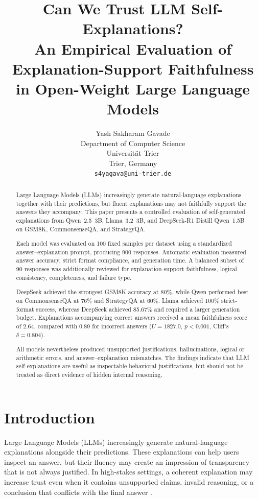 \documentclass{article}
\title{
Can We Trust LLM Self-Explanations?\\
An Empirical Evaluation of Explanation-Support Faithfulness
in Open-Weight Large Language Models
}
\author{
Yash Sakharam Gavade\\
Department of Computer Science\\
Universit\"at Trier\\
Trier, Germany\\
\texttt{s4yagava@uni-trier.de}
}
\begin{document}
\maketitle

\begin{abstract}

Large Language Models (LLMs) increasingly generate natural-language
explanations together with their predictions, but fluent explanations
may not faithfully support the answers they accompany. This paper
presents a controlled evaluation of self-generated explanations from
Qwen~2.5~3B, Llama~3.2~3B, and DeepSeek-R1 Distill Qwen~1.5B on
GSM8K, CommonsenseQA, and StrategyQA.

Each model was evaluated on 100 fixed samples per dataset using a
standardized answer--explanation prompt, producing 900 responses.
Automatic evaluation measured answer accuracy, strict format
compliance, and generation time. A balanced subset of 90 responses was
additionally reviewed for explanation-support faithfulness, logical
consistency, completeness, and failure type.

DeepSeek achieved the strongest GSM8K accuracy at 80\%, while Qwen
performed best on CommonsenseQA at 76\% and StrategyQA at 60\%.
Llama achieved 100\% strict-format success, whereas DeepSeek achieved
85.67\% and required a larger generation budget. Explanations
accompanying correct answers received a mean faithfulness score of
2.64, compared with 0.89 for incorrect answers
($U=1827.0$, $p<0.001$, Cliff's $\delta=0.804$).

All models nevertheless produced unsupported justifications,
hallucinations, logical or arithmetic errors, and
answer--explanation mismatches. The findings indicate that LLM
self-explanations are useful as inspectable behavioral justifications,
but should not be treated as direct evidence of hidden internal
reasoning.

\end{abstract}




\section{Introduction}

Large Language Models (LLMs) increasingly generate natural-language
explanations alongside their predictions. These explanations can help
users inspect an answer, but their fluency may create an impression of
transparency that is not always justified. In high-stakes settings, a
coherent explanation may increase trust even when it contains
unsupported claims, invalid reasoning, or a conclusion that conflicts
with the final answer
\cite{gunning2019darpa,chang2024survey,schneider2024genxai,
miller2019explanation}.
\end{document}
